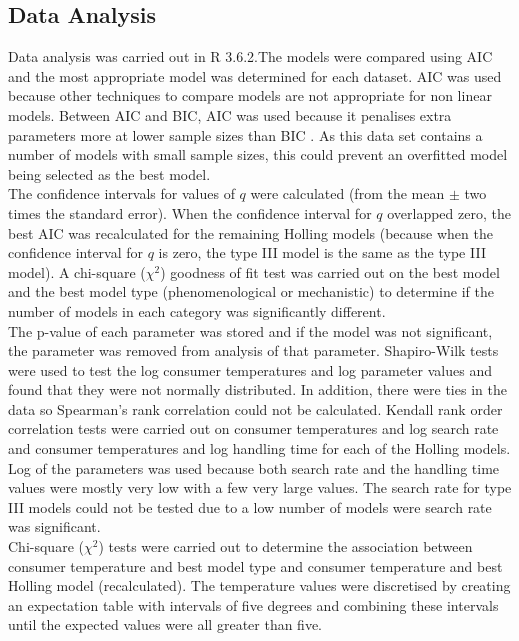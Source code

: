 \documentclass{article}
\begin{document}
\subsection{Data Analysis}
Data analysis was carried out in R 3.6.2\cite{RCoreTeam2017}.The models were compared using AIC and the most appropriate model was determined for each dataset. AIC was used because other techniques to compare models are not appropriate for non linear models. Between AIC and BIC, AIC was used because it penalises extra parameters more at lower sample sizes than BIC \cite{Johnson2004ModelEvolution}. As this data set contains  a number of models with small sample sizes, this could prevent an overfitted model being selected as the best model.\\ 
The confidence intervals for values of $q$ were calculated (from the mean $\pm$ two times the standard error). When the confidence interval for $q$ overlapped zero, the best AIC was recalculated for the remaining Holling models (because when the confidence interval for $q$ is zero, the type III model is the same as the type III model).
A chi-square ($\chi^2$) goodness of fit test was carried out on the best model and the best model type (phenomenological or mechanistic) to determine if the number of models in each category was significantly different.\\
The p-value of each parameter was stored and if the model was not significant, the parameter was removed from analysis of that parameter. Shapiro-Wilk tests were used to test the log consumer temperatures and log parameter values and found that they were not normally distributed. In addition, there were ties in the data so Spearman's rank correlation could not be calculated.  Kendall rank order correlation tests were carried out on consumer temperatures and log search rate and consumer temperatures and log handling time for each of the Holling models. Log of the parameters was used because both search rate and the handling time values were mostly very low with  a few very large values. The search rate for type III models could not be tested due to a low number of models were search rate was significant. \\ 
Chi-square ($\chi^2$) tests were carried out to determine the association between consumer temperature and best model type and consumer temperature and best Holling model (recalculated). The temperature values were discretised by creating an expectation table with intervals of five degrees and combining these intervals until the expected values were all greater than five.
\end{document}
